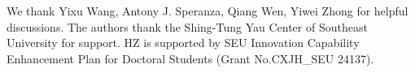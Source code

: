 \documentclass[a4paper,11pt]{article}
\renewcommand{\=}[1]{\stackrel{#1}{=}} %
\begin{document}
		
		
		

	
 
\acknowledgments

We thank Yixu Wang, Antony J. Speranza, Qiang Wen, Yiwei Zhong for helpful discussions. The authors thank the Shing-Tung Yau Center of Southeast University for support. HZ is supported by SEU Innovation Capability Enhancement Plan for Doctoral Students (Grant No.CXJH\_SEU 24137).












\end{document}
